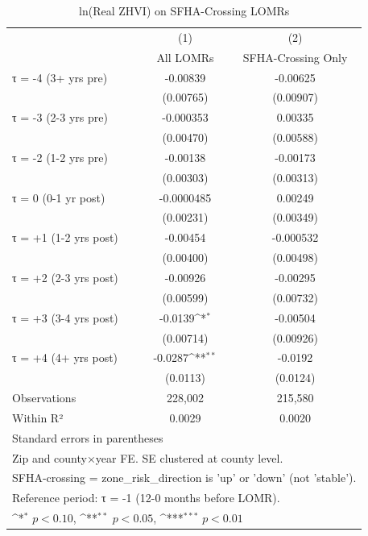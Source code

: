 \begin{table}[htbp]\centering
\def\sym#1{\ifmmode^{#1}\else\(^{#1}\)\fi}
\caption{ln(Real ZHVI) on SFHA-Crossing LOMRs}
\label{tab:sfha_crossing}
\begin{tabular}{l*{2}{c}}
\hline\hline
                    &\multicolumn{1}{c}{(1)}&\multicolumn{1}{c}{(2)}\\
                    &\multicolumn{1}{c}{All LOMRs}&\multicolumn{1}{c}{SFHA-Crossing Only}\\
\hline
τ = -4 (3+ yrs pre) &    -0.00839         &    -0.00625         \\
                    &   (0.00765)         &   (0.00907)         \\
[0.3em]
τ = -3 (2-3 yrs pre)&   -0.000353         &     0.00335         \\
                    &   (0.00470)         &   (0.00588)         \\
[0.3em]
τ = -2 (1-2 yrs pre)&    -0.00138         &    -0.00173         \\
                    &   (0.00303)         &   (0.00313)         \\
[0.3em]
τ = 0 (0-1 yr post) &  -0.0000485         &     0.00249         \\
                    &   (0.00231)         &   (0.00349)         \\
[0.3em]
τ = +1 (1-2 yrs post)&    -0.00454         &   -0.000532         \\
                    &   (0.00400)         &   (0.00498)         \\
[0.3em]
τ = +2 (2-3 yrs post)&    -0.00926         &    -0.00295         \\
                    &   (0.00599)         &   (0.00732)         \\
[0.3em]
τ = +3 (3-4 yrs post)&     -0.0139\sym{*}  &    -0.00504         \\
                    &   (0.00714)         &   (0.00926)         \\
[0.3em]
τ = +4 (4+ yrs post)&     -0.0287\sym{**} &     -0.0192         \\
                    &    (0.0113)         &    (0.0124)         \\
\hline
Observations        &     228,002         &     215,580         \\
Within R²           &      0.0029         &      0.0020         \\
\hline\hline
\multicolumn{3}{l}{\footnotesize Standard errors in parentheses}\\
\multicolumn{3}{l}{\footnotesize Zip and county×year FE. SE clustered at county level.}\\
\multicolumn{3}{l}{\footnotesize SFHA-crossing = zone\_risk\_direction is 'up' or 'down' (not 'stable').}\\
\multicolumn{3}{l}{\footnotesize Reference period: τ = -1 (12-0 months before LOMR).}\\
\multicolumn{3}{l}{\footnotesize \sym{*} \(p<0.10\), \sym{**} \(p<0.05\), \sym{***} \(p<0.01\)}\\
\end{tabular}
\end{table}
